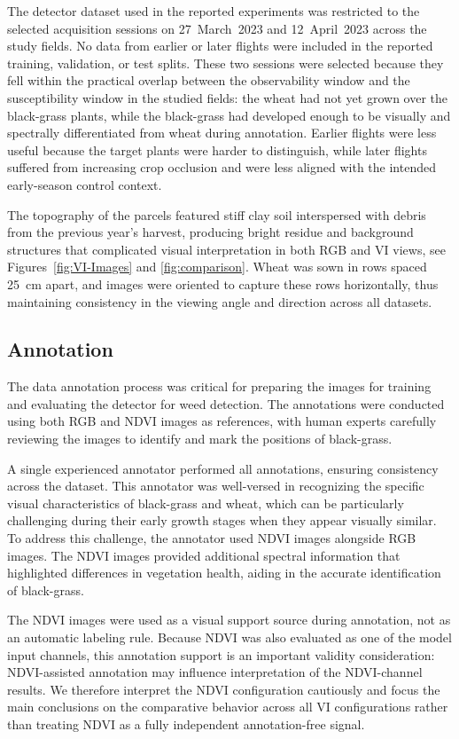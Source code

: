 \documentclass{ieeeaccess}
\begin{document}
The detector dataset used in the reported experiments was restricted to the selected acquisition sessions on 27~March~2023 and 12~April~2023 across the study fields. No data from earlier or later flights were included in the reported training, validation, or test splits. These two sessions were selected because they fell within the practical overlap between the observability window and the susceptibility window in the studied fields: the wheat had not yet grown over the black-grass plants, while the black-grass had developed enough to be visually and spectrally differentiated from wheat during annotation. Earlier flights were less useful because the target plants were harder to distinguish, while later flights suffered from increasing crop occlusion and were less aligned with the intended early-season control context.

The topography of the parcels featured stiff clay soil interspersed with debris from the previous year's harvest, producing bright residue and background structures that complicated visual interpretation in both RGB and VI views, see Figures~\ref{fig:VI-Images} and \ref{fig:comparison}. Wheat was sown in rows spaced 25~cm apart, and images were oriented to capture these rows horizontally, thus maintaining consistency in the viewing angle and direction across all datasets.

\subsection{Annotation}
The data annotation process was critical for preparing the images for training and evaluating the detector for weed detection. The annotations were conducted using both RGB and NDVI images as references, with human experts carefully reviewing the images to identify and mark the positions of black-grass.

A single experienced annotator performed all annotations, ensuring consistency across the dataset. This annotator was well-versed in recognizing the specific visual characteristics of black-grass and wheat, which can be particularly challenging during their early growth stages when they appear visually similar. To address this challenge, the annotator used NDVI images alongside RGB images. The NDVI images provided additional spectral information that highlighted differences in vegetation health, aiding in the accurate identification of black-grass.

The NDVI images were used as a visual support source during annotation, not as an automatic labeling rule. Because NDVI was also evaluated as one of the model input channels, this annotation support is an important validity consideration: NDVI-assisted annotation may influence interpretation of the NDVI-channel results. We therefore interpret the NDVI configuration cautiously and focus the main conclusions on the comparative behavior across all VI configurations rather than treating NDVI as a fully independent annotation-free signal.
\end{document}
